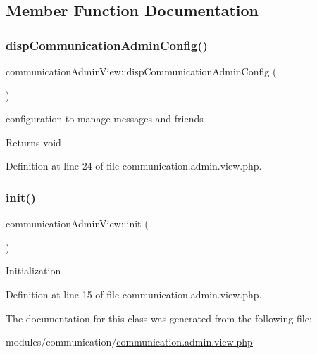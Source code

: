 \subsection{Member Function Documentation}
\mbox{\label{classcommunicationAdminView_a622dd5ee36cad7a2c2e9d9eea814b0eb}} 
\subsubsection{\texorpdfstring{disp\+Communication\+Admin\+Config()}{dispCommunicationAdminConfig()}}
{\footnotesize\ttfamily communication\+Admin\+View\+::disp\+Communication\+Admin\+Config (\begin{DoxyParamCaption}{ }\end{DoxyParamCaption})}

configuration to manage messages and friends \begin{DoxyReturn}{Returns}
void 
\end{DoxyReturn}


Definition at line 24 of file communication.\+admin.\+view.\+php.

\mbox{\label{classcommunicationAdminView_a75c54eb9cc38929b399c2e5aa600c979}} 
\subsubsection{\texorpdfstring{init()}{init()}}
{\footnotesize\ttfamily communication\+Admin\+View\+::init (\begin{DoxyParamCaption}{ }\end{DoxyParamCaption})}

Initialization 

Definition at line 15 of file communication.\+admin.\+view.\+php.



The documentation for this class was generated from the following file\+:\begin{DoxyCompactItemize}
\item 
modules/communication/\hyperlink{communication_8admin_8view_8php}{communication.\+admin.\+view.\+php}\end{DoxyCompactItemize}
